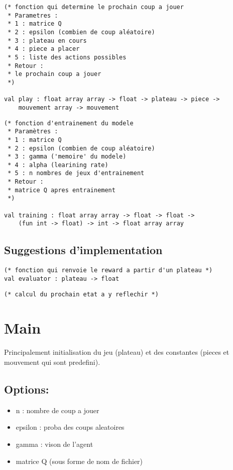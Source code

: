 \documentclass{article}
\begin{document}
\begin{lstlisting}[frame=L]
(* fonction qui determine le prochain coup a jouer
 * Parametres :
 * 1 : matrice Q
 * 2 : epsilon (combien de coup aléatoire)
 * 3 : plateau en cours
 * 4 : piece a placer
 * 5 : liste des actions possibles
 * Retour :
 * le prochain coup a jouer
 *)

val play : float array array -> float -> plateau -> piece ->
	mouvement array -> mouvement
\end{lstlisting}

\begin{lstlisting}[frame=L]
(* fonction d'entrainement du modele
 * Paramètres :
 * 1 : matrice Q
 * 2 : epsilon (combien de coup aléatoire)
 * 3 : gamma ('memoire' du modele)
 * 4 : alpha (learining rate)
 * 5 : n nombres de jeux d'entrainement
 * Retour :
 * matrice Q apres entrainement
 *)

val training : float array array -> float -> float ->
	(fun int -> float) -> int -> float array array
\end{lstlisting}

\subsection{Suggestions d'implementation}

\begin{lstlisting}[frame=L]
(* fonction qui renvoie le reward a partir d'un plateau *)
val evaluator : plateau -> float
\end{lstlisting}

\begin{lstlisting}
(* calcul du prochain etat a y reflechir *)
\end{lstlisting}

\section{Main}

Principalement initialisation du jeu (plateau) et des constantes (pieces et
mouvement qui sont predefini).


\subsection{Options:}
\begin{itemize}
	\item n : nombre de coup a jouer
	\item epsilon : proba des coups aleatoires
	\item gamma : vison de l'agent
	\item matrice Q (sous forme de nom de fichier)
\end{itemize}
\end{document}
